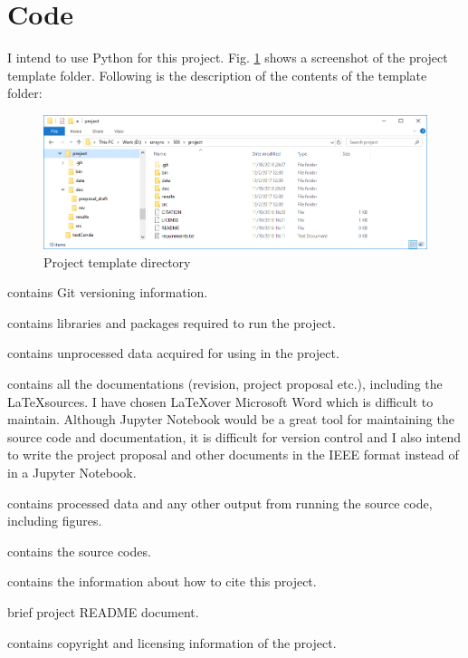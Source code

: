\documentclass[conference]{IEEEtran}
\begin{document}
\section{Code}
I intend to use Python for this project. Fig. \ref{fig1} shows a screenshot of the project template folder. Following is the description of the contents of the template folder:

\begin{figure}[htbp]
\centerline{\includegraphics[width=130mm]{../../results/Capture.PNG}}
\caption{Project template directory}
\label{fig1}
\end{figure}

\begin{description}[style=multiline,leftmargin=6em]
	\item[\textbf{.git}]{contains Git versioning information.}
	\item[\textbf{bin}] contains libraries and packages required to run the project.
	\item[\textbf{data}] contains unprocessed data acquired for using in the project.
	\item[\textbf{doc}] contains all the documentations (revision, project proposal etc.), including the \LaTeX sources. I have chosen \LaTeX over Microsoft Word which is difficult to maintain. Although Jupyter Notebook would be a great tool for maintaining the source code and documentation, it is difficult for version control and I also intend to write the project proposal and other documents in the IEEE format instead of in a Jupyter Notebook.
	\item[\textbf{results}] contains processed data and any other output from running the source code, including figures.
	\item[\textbf{src}] contains the source codes.
	\item[\textbf{CITATION}] contains the information about how to cite this project.
	\item[\textbf{README}] brief project README document.
	\item[\textbf{LICENSE}] contains copyright and licensing information of the project.
\end{description}
\end{document}
